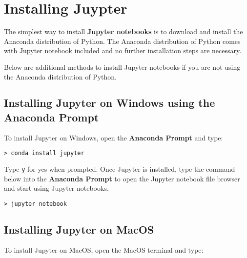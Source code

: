 \documentclass{book}
\newcommand{\passthrough}[1]{#1}
\begin{document}
    
        \hypertarget{installing-juypter}{%
\section{Installing Juypter}\label{installing-juypter}}
    




    
        The simplest way to install \textbf{Jupyter notebooks} is to download
and install the Anaconda distribution of Python. The Anaconda
distribution of Python comes with Jupyter notebook included and no
further installation steps are necessary.

Below are additional methods to install Jupyter notebooks if you are not
using the Anaconda distribution of Python.
    




    
        \hypertarget{installing-jupyter-on-windows-using-the-anaconda-prompt}{%
\subsection{Installing Jupyter on Windows using the Anaconda
Prompt}\label{installing-jupyter-on-windows-using-the-anaconda-prompt}}

To install Jupyter on Windows, open the \textbf{Anaconda Prompt} and
type:

\begin{lstlisting}
> conda install jupyter
\end{lstlisting}

Type \passthrough{\lstinline!y!} for yes when prompted. Once Jupyter is
installed, type the command below into the \textbf{Anaconda Prompt} to
open the Jupyter notebook file browser and start using Jupyter
notebooks.

\begin{lstlisting}
> jupyter notebook
\end{lstlisting}
    




    
        \hypertarget{installing-jupyter-on-macos}{%
\subsection{Installing Jupyter on
MacOS}\label{installing-jupyter-on-macos}}

To install Jupyter on MacOS, open the MacOS terminal and type:
\end{document}
